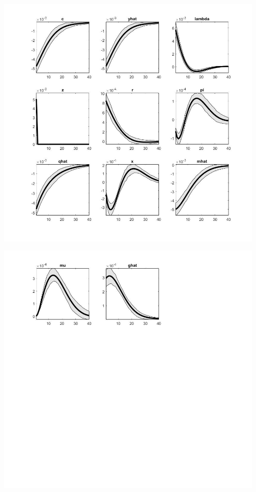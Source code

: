 \documentclass[11pt,preprint, authoryear]{elsarticle}
\let\origfigure\figure
\let\endorigfigure\endfigure
\renewenvironment{figure}[1][2] {
    \expandafter\origfigure\expandafter[H]
} {
    \endorigfigure
}
\numberwithin{equation}{section}
\numberwithin{figure}{section}
\numberwithin{table}{section}
\begin{document}
\begin{figure}
    \centering 
    \begin{minipage}[t]{8.2cm} 
        \centering 
        \includegraphics[width=\linewidth]{flex_z1.jpg} 
    \end{minipage} 
    \hspace{0.1cm} 
    \begin{minipage}[t]{8.2cm} 
        \centering 
        \includegraphics[width=\linewidth]{flex_z2.jpg} 
    \end{minipage}
    \caption{Orthogonalized Shock to Productivity Shock - Flexible Money Growth Rule}
    \label{flex_z}
\end{figure}
\end{document}
